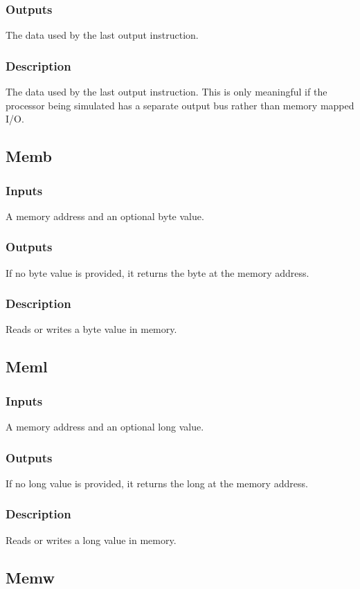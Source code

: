 \documentclass[10pt, openany]{book}
\begin{document}
\subsubsection{Outputs}
The data used by the last output instruction.
\subsubsection{Description}
The data used by the last output instruction.  This is only meaningful if the processor being simulated has a separate output bus rather than memory mapped I/O.

\subsection{Memb}
\subsubsection{Inputs}
A memory address and an optional byte value.
\subsubsection{Outputs}
If no byte value is provided, it returns the byte at the memory address.
\subsubsection{Description}
Reads or writes a byte value in memory.

\subsection{Meml}
\subsubsection{Inputs}
A memory address and an optional long value.
\subsubsection{Outputs}
If no long value is provided, it returns the long at the memory address.
\subsubsection{Description}
Reads or writes a long value in memory.

\subsection{Memw}
\end{document}
